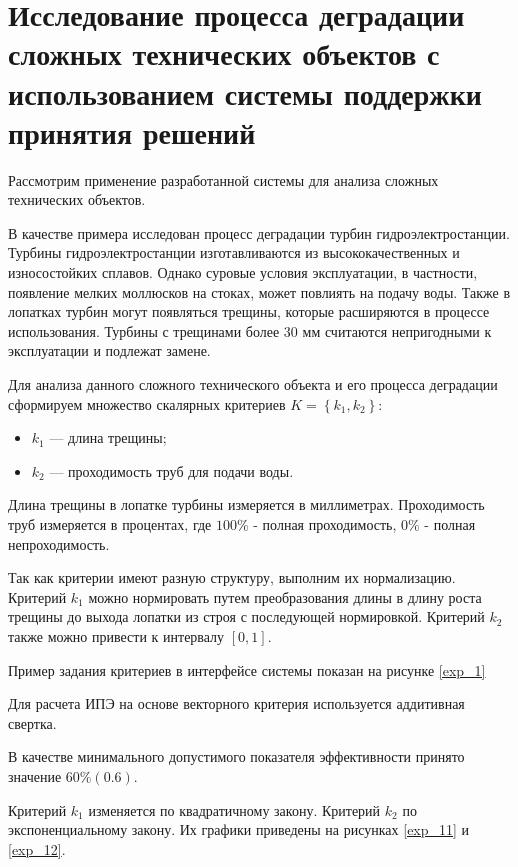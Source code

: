 \section{Исследование процесса деградации сложных технических объектов с использованием системы поддержки принятия решений}

Рассмотрим применение разработанной системы для анализа сложных технических объектов.

В качестве примера исследован процесс деградации турбин гидроэлектростанции.
Турбины гидроэлектростанции изготавливаются из высококачественных и износостойких сплавов.
Однако суровые условия эксплуатации, в частности, появление мелких моллюсков на стоках, может повлиять на подачу воды.
Также в лопатках турбин могут появляться трещины, которые расширяются в процессе использования.
Турбины с трещинами более 30 мм считаются непригодными к эксплуатации и подлежат замене.

Для анализа данного сложного технического объекта и его процесса деградации сформируем множество скалярных критериев $K=\left\{k_1,k_2\right\}$:
\begin{itemize}
    \item $k_1$ --- длина трещины;
    \item $k_2$ --- проходимость труб для подачи воды.
\end{itemize}

Длина трещины в лопатке турбины измеряется в миллиметрах.
Проходимость труб измеряется в процентах, где $100\%$ - полная проходимость, $0\%$ - полная непроходимость.

Так как критерии имеют разную структуру, выполним их нормализацию. 
Критерий $k_1$ можно нормировать путем преобразования длины в длину роста трещины до выхода лопатки из строя с последующей нормировкой.
Критерий $k_2$ также можно привести к интервалу $[0,1]$.

Пример задания критериев в интерфейсе системы показан на рисунке \ref{exp_1}


Для расчета ИПЭ на основе векторного критерия используется аддитивная свертка.

В качестве минимального допустимого показателя эффективности принято значение $60\% (0.6)$.

Критерий $k_1$ изменяется по квадратичному закону. Критерий $k_2$ по экспоненциальному закону. 
Их графики приведены на рисунках \ref{exp_11} и \ref{exp_12}.

